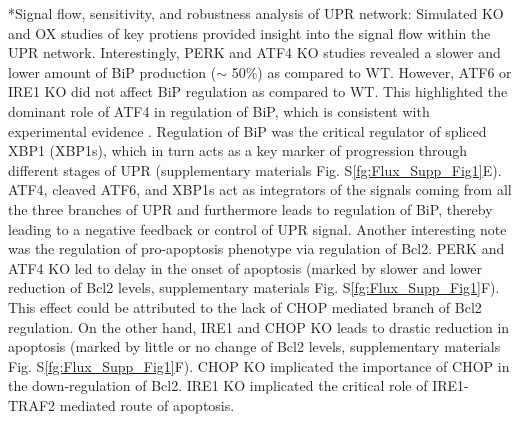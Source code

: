 \documentclass[12pt]{article}
\makeatletter
\renewcommand\subsection{\@startsection
	{subsection}{2}{0mm}
	{-0.05in}
	{-0.5\baselineskip}
	{\normalfont\normalsize\bfseries}}
\makeatother
\begin{document}
\subsection*{Signal flow, sensitivity, and robustness analysis of UPR network:}
Simulated KO and OX studies of key protiens provided insight into the signal flow within the UPR network. Interestingly, PERK and ATF4 KO studies revealed a slower and lower amount of BiP production ($\sim$ 50\%) as compared to WT. However, ATF6 or IRE1 KO did not affect BiP regulation as compared to WT. This highlighted the dominant role of ATF4 in regulation of BiP, which is consistent with experimental evidence \citep{ma2003delineation}. Regulation of BiP was the critical regulator of spliced XBP1 (XBP1s), which in turn acts as a key marker of progression through different stages of UPR (supplementary materials Fig. S\ref{fg:Flux_Supp_Fig1}E). ATF4, cleaved ATF6, and XBP1s act as integrators of the signals coming from all the three branches of UPR and furthermore leads to regulation of BiP, thereby leading to a negative feedback or control of UPR signal. Another interesting note was the regulation of pro-apoptosis phenotype via regulation of Bcl2. PERK and ATF4 KO led to delay in the onset of apoptosis (marked by slower and lower reduction of Bcl2 levels, supplementary materials Fig. S\ref{fg:Flux_Supp_Fig1}F). This effect could be attributed to the lack of CHOP mediated branch of Bcl2 regulation. On the other hand, IRE1 and CHOP KO leads to drastic reduction in apoptosis (marked by little or no change of Bcl2 levels, supplementary materials Fig. S\ref{fg:Flux_Supp_Fig1}F). CHOP KO implicated the importance of CHOP in the down-regulation of Bcl2. IRE1 KO implicated the critical role of IRE1-TRAF2 mediated route of apoptosis. 
\end{document}
